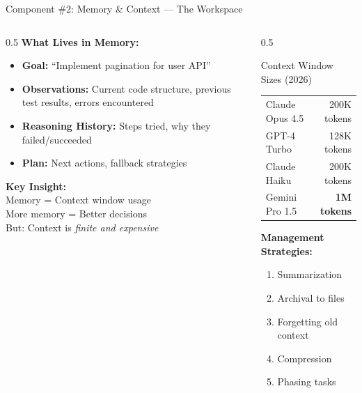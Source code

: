 \documentclass[aspectratio=169, 11pt]{beamer}
\begin{document}
\begin{frame}{Component \#2: Memory \& Context --- The Workspace}
    \begin{columns}[T]
        \begin{column}{0.5\textwidth}
            \textbf{What Lives in Memory:}
            \begin{itemize}
                \item \textbf{Goal:} ``Implement pagination for user API''
                \item \textbf{Observations:} Current code structure, previous test results, errors encountered
                \item \textbf{Reasoning History:} Steps tried, why they failed/succeeded
                \item \textbf{Plan:} Next actions, fallback strategies
            \end{itemize}

            \vspace{0.3cm}
            \textbf{Key Insight:}\\
            Memory = Context window usage\\
            More memory = Better decisions\\
            But: Context is \textit{finite and expensive}
        \end{column}
        \begin{column}{0.5\textwidth}
            \begin{block}{Context Window Sizes (2026)}
                \footnotesize
                \begin{tabular}{lr}
                    Claude Opus 4.5 & 200K tokens \\
                    GPT-4 Turbo & 128K tokens \\
                    Claude Haiku & 200K tokens \\
                    Gemini Pro 1.5 & \textbf{1M tokens} \\
                \end{tabular}
            \end{block}

            \vspace{0.3cm}
            \textbf{Management Strategies:}
            \begin{enumerate}
                \item Summarization
                \item Archival to files
                \item Forgetting old context
                \item Compression
                \item Phasing tasks
            \end{enumerate}
        \end{column}
    \end{columns}

\end{frame}
\end{document}
